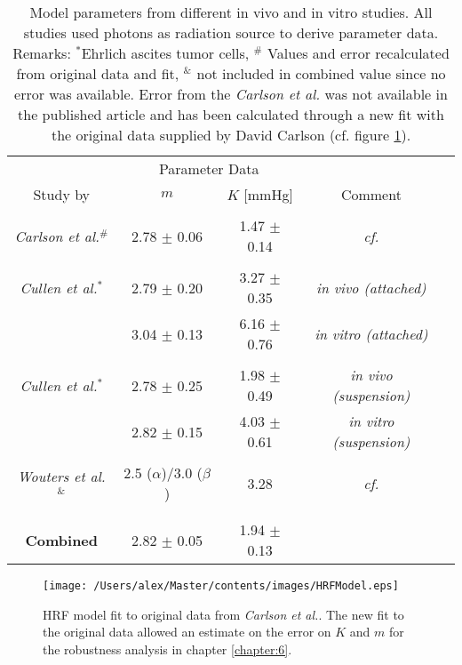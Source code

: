 \begin{table}[tb]
\small
\centering
\begin{tabular}{ccccc}
\toprule
\multicolumn{1}{c}{} & \multicolumn{2}{c}{Parameter Data} \\
\cmidrule(r){2-3}
Study by &  $m$ & $K$ [mmHg] & Comment\\
\midrule\\
\textit{Carlson et al.}\cite{pmid21183291}$^\#$ & 2.78 $\pm$ 0.06 & 1.47 $\pm$ 0.14 & \textit{cf.} \cite{pmid7410133}\cite{pmid6718689}\cite{pmid412319}\cite{pmid17022202}\\\\
\textit{Cullen et al.}\cite{pmid4616914}$^*$	 & 2.79 $\pm$ 0.20 & 3.27 $\pm$ 0.35 & \textit{in vivo (attached)}\\
									 & 3.04 $\pm$ 0.13 & 6.16 $\pm$ 0.76 & \textit{in vitro (attached)}\\\\
\textit{Cullen et al.}\cite{pmid1084867}$^*$	 & 2.78 $\pm$ 0.25 & 1.98 $\pm$ 0.49 & \textit{in vivo (suspension)}\\
									 & 2.82 $\pm$ 0.15 & 4.03 $\pm$ 0.61 & \textit{in vitro (suspension)}\\\\
\textit{Wouters et al.}\cite{pmid9146699}$^\&$  & 2.5 ($\alpha$)/3.0 ($\beta$) & 3.28 & \textit{cf.} \cite{pmid412319}\cite{pmid6718689}\\\\
\bottomrule\\
\textbf{Combined} & 2.82 $\pm$ 0.05 & 1.94 $\pm$ 0.13 & 
\end{tabular}
\caption{Model parameters from different in vivo and in vitro studies. All studies used photons as radiation source to derive parameter data. Remarks: $^*$Ehrlich ascites tumor cells, $^\#$ Values and error recalculated from original data and fit, $^\&$ not included in combined value since no error was available. Error from the \textit{Carlson et al.} was not available in the published article and has been calculated through a new fit with the original data supplied by David Carlson (cf. figure \ref{fig:HRFModel}).}
\label{tab:modelparameter}
\end{table}
\begin{figure}[htb]
\centering
\texttt{[image: /Users/alex/Master/contents/images/HRFModel.eps]}
\caption{HRF model fit to original data from \textit{Carlson et al.}\cite{pmid21183291}. The new fit to the original data allowed an estimate on the error on $K$ and $m$ for the robustness analysis in chapter \ref{chapter:6}.}
\label{fig:HRFModel}
\end{figure}
